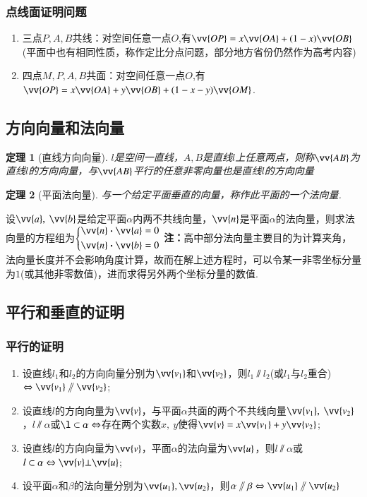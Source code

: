 \documentclass{BHCexam}
\newtheorem{Therome}{定理}[section]
\begin{document}
\subsubsection{点线面证明问题}
\begin{enumerate}[1)]
\item 三点$ P,A,B $共线：对空间任意一点$O$,有$\vv{OP}=x\vv{OA}+(1-x)\vv{OB}$(平面中也有相同性质，称作定比分点问题，部分地方省份仍然作为高考内容)
\item 四点$M,P,A,B$共面：对空间任意一点$O$,有$\vv{OP}=x\vv{OA}+y\vv{OB}+(1-x-y)\vv{OM}$.
\end{enumerate}

\subsection{方向向量和法向量}
\begin{Therome}[直线方向向量]
$l$是空间一直线，$A,B$是直线$l$上任意两点，则称$\vv{AB}$为直线$l$的方向向量，与$\vv{AB}$平行的任意非零向量也是直线$l$的方向向量
\end{Therome}
\begin{Therome}[平面法向量]
与一个给定平面垂直的向量，称作此平面的一个法向量.
\end{Therome}

设$ \vv{a},\ \vv{b} $是给定平面$ \alpha $内两不共线向量，$ \vv{n} $是平面$ \alpha $的法向量，则求法向量的方程组为$\begin{dcases}
\vv{n}\bm{\cdot}\vv{a}=0\\
\vv{n}\bm{\cdot}\vv{b}=0
\end{dcases}$
{\kaishu \textbf{注：}高中部分法向量主要目的为计算夹角，法向量长度并不会影响角度计算，故而在解上述方程时，可以令某一非零坐标分量为$ 1 $(或其他非零数值)，进而求得另外两个坐标分量的数值.}

\subsection{平行和垂直的证明}
\subsubsection{平行的证明}
\begin{enumerate}[1)]
\item 设直线$l_1$和$l_2$的方向向量分别为$\vv{v_1}$和$\vv{v_2}$，则$l_1\sslash l_2$(或$l_1$与$l_2$重合)$\Leftrightarrow\vv{v_1}\sslash \vv{v_2}$;
\item 设直线$ l $的方向向量为$ \vv{v} $，与平面$ \alpha $共面的两个不共线向量$ \vv{v_1},\ \vv{v_2} $，$ l\sslash\alpha $或$ \l\subset\alpha \Leftrightarrow$存在两个实数$ x,\ y $使得$ \vv{v}=x\vv{v_1}+y\vv{v_2} $;
\item 设直线$ l $的方向向量为$ \vv{v} $，平面$ \alpha $的法向量为$ \vv{u} $，则$ l\sslash\alpha $或$ l\subset\alpha\Leftrightarrow\vv{v}\bot\vv{u} $;
\item 设平面$ \alpha $和$ \beta $的法向量分别为$ \vv{u_1},\vv{u_2} $，则$ \alpha\sslash\beta\Leftrightarrow\vv{u_1}\sslash\vv{u_2} $
\end{enumerate}
\end{document}
